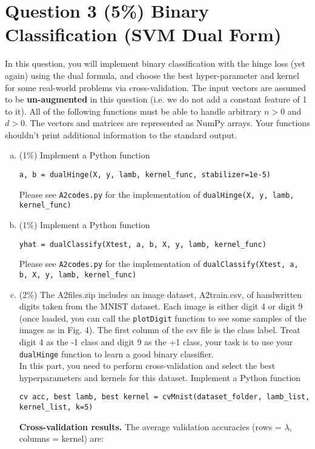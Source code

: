 \documentclass[12pt]{article}
\newcounter{ques}
\begin{document}
\section*{Question 3 (5\%) Binary Classification (SVM Dual Form)}
In this question, you will implement binary classification with the hinge loss (yet again) using the dual formula, and choose the best hyper-parameter and kernel for some real-world problems via cross-validation.
The input vectors are assumed to be \textbf{un-augmented} in this question (i.e. we do not add a constant feature of 1 to it). All of the following functions must be able to handle arbitrary $n > 0$ and $d > 0$. The vectors and matrices are represented as NumPy arrays. Your functions shouldn't print additional information to the
standard output.
\begin{enumerate}[(a)]
  \item (1\%) Implement a Python function
    \begin{center}
      \texttt{a, b = dualHinge(X, y, lamb, kernel\_func, stabilizer=1e-5)}
    \end{center}
    Please see \texttt{A2codes.py} for the implementation of \texttt{dualHinge(X, y, lamb, kernel\_func)}
  \item (1\%) Implement a Python function
    \begin{center}
      \texttt{yhat = dualClassify(Xtest, a, b, X, y, lamb, kernel\_func)}
    \end{center}
    Please see \texttt{A2codes.py} for the implementation of \texttt{dualClassify(Xtest, a, b, X, y, lamb, kernel\_func)}
  \item (2\%) The A2files.zip includes an image dataset, A2train.csv, of handwritten digits taken from the MNIST dataset. Each image is either digit 4 or digit 9 (once loaded, you can call the \texttt{plotDigit} function to see some samples of the images as in Fig. 4). The first column of the csv file is the class label. Treat digit 4 as the -1 class and digit 9 as the +1 class, your task is to use your \texttt{dualHinge} function to learn a good binary classifier.\\
  In this part, you need to perform cross-validation and select the best hyperparameters and kernels for this dataset. Implement a Python function
  \begin{center}
    \texttt{cv acc, best lamb, best kernel = cvMnist(dataset\_folder, lamb\_list, kernel\_list, k=5)}
  \end{center}
  \noindent\textbf{Cross-validation results.}
  The average validation accuracies (rows = $\lambda$, columns = kernel) are:

\end{enumerate}
\end{document}
